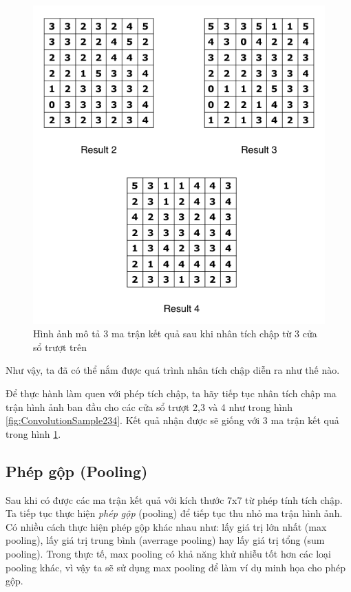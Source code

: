 \begin{figure}[!h]
	\centering
		\includegraphics[width=0.8\columnwidth]{chapter05/figure/convolution_filter_result_2_3_4.png}
		\centering
	\caption{Hình ảnh mô tả 3 ma trận kết quả sau khi nhân tích chập từ 3 cửa sổ trượt trên}
	\label{fig:ConvolutionResult234}
\end{figure}

Như vậy, ta đã có thể nắm được quá trình nhân tích chập diễn ra như thế nào.

Để thực hành làm quen với phép tích chập, ta hãy tiếp tục nhân tích chập ma trận hình ảnh ban đầu cho các cửa sổ trượt 2,3 và 4 như trong hình \ref{fig:ConvolutionSample234}. Kết quả nhận được sẽ giống với 3 ma trận kết quả trong hình \ref{fig:ConvolutionResult234}.


\subsection{Phép gộp (Pooling)}
\hspace{\parindent} Sau khi có được các ma trận kết quả với kích thước 7x7 từ phép tính tích chập. Ta tiếp tục thực hiện \textit{phép gộp} (pooling) để tiếp tục thu nhỏ ma trận hình ảnh. Có nhiều cách thực hiện phép gộp khác nhau như: lấy giá trị lớn nhất (max pooling), lấy giá trị trung bình (averrage pooling) hay lấy giá trị tổng (sum pooling). Trong thực tế, max pooling có khả năng khử nhiễu tốt hơn các loại pooling khác, vì vậy ta sẽ sử dụng max pooling để làm ví dụ minh họa cho phép gộp.

